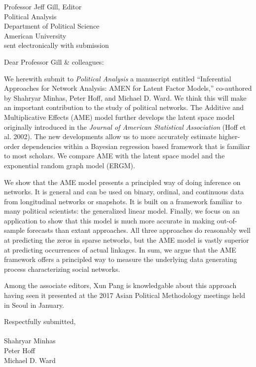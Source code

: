 \documentclass[10pt]{letter}
\begin{document}
\begin{letter}
{Professor Jeff Gill, Editor\\
Political Analysis\\
Department of Political Science\\
American University\\
sent electronically with submission}


\opening{Dear Professor Gill \& colleagues:}

We herewith submit to \textit{Political Analysis} a manuscript entitled ``Inferential Approaches for Network Analysis: AMEN for Latent Factor Models,'' co-authored by Shahryar Minhas, Peter Hoff, and Michael D. Ward.  We think this will make an important contribution to the study of political networks.  The Additive and Multiplicative Effects (AME) model further develops the latent space model originally introduced in the \textit{Journal of American Statistical Association} (Hoff et al. 2002). The new developments allow us to more accurately estimate higher-order dependencies within a Bayesian regression based framework that is familiar to most scholars. We compare AME with the latent space model and the exponential random graph model (ERGM).   

We show that the AME model presents a principled way of doing inference on networks. It is general and can be used on binary, ordinal, and continuous data from longitudinal networks or snapshots. It is built on a framework familiar to many political scientists: the generalized linear model. Finally, we focus on an application to show that this model is much more accurate in making out-of-sample forecasts than extant approaches.  All three approaches do reasonably well at predicting the zeros in sparse networks, but the AME model is vastly superior at predicting occurrences of actual linkages. In sum, we argue that the AME framework offers a principled way to measure the underlying data generating process characterizing social networks. 

Among the associate editors, Xun Pang is knowledgable about this approach having seen it presented at the 2017 Asian Political Methodology meetings held in Seoul in January.  

\closing{Respectfully submitted,\\~\\ Shahryar Minhas\\Peter Hoff\\Michael D. Ward} \vspace{.1in}


\end{letter}
\end{document}
